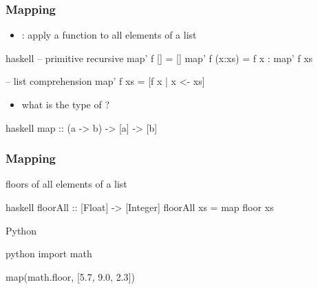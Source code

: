 \documentclass[dvipsnames]{beamer}
\theoremstyle{plain}
\begin{document}
\begin{frame}[fragile]
  \frametitle{Mapping}

  \begin{itemize}
    \item {}: apply a function to all elements of a list
  \end{itemize}

  \begin{exampleblock}{}
    \begin{pygments}{haskell}
-- primitive recursive
map' f []     = []
map' f (x:xs) = f x : map' f xs

-- list comprehension
map' f xs = [f x | x <- xs]
    \end{pygments}
  \end{exampleblock}

  \pause
  \begin{itemize}
    \item what is the type of ?
  \end{itemize}

  \begin{pygments}{haskell}
map :: (a -> b) -> [a] -> [b]
  \end{pygments}
\end{frame}

\begin{frame}[fragile]
  \frametitle{Mapping}

  \begin{exampleblock}{floors of all elements of a list}
    \begin{pygments}{haskell}
floorAll :: [Float] -> [Integer]
floorAll xs = map floor xs
    \end{pygments}
  \end{exampleblock}

  \bigskip
  \begin{exampleblock}{Python}
    \begin{pygments}{python}
import math

map(math.floor, [5.7, 9.0, 2.3])
    \end{pygments}
  \end{exampleblock}
\end{frame}
\end{document}
